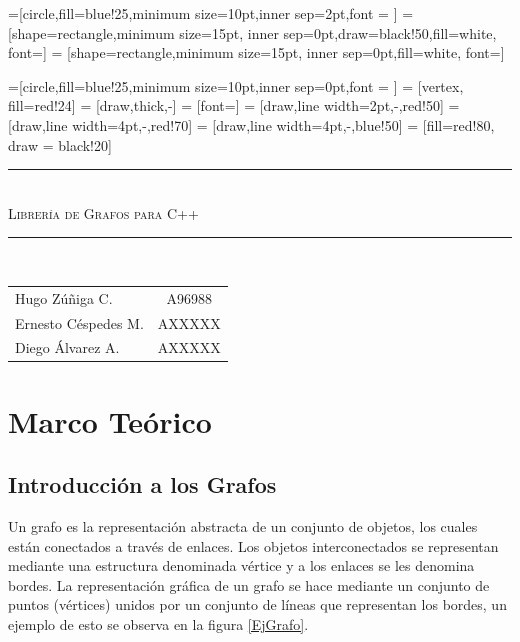 \documentclass[a4paper, 11pt]{report}
\newcommand{\HRule}[1]{\rule{\linewidth}{#1}}
\begin{document}
=[circle,fill=blue!25,minimum size=10pt,inner sep=2pt,font = \small]
 = [shape=rectangle,minimum size=15pt, inner sep=0pt,draw=black!50,fill=white, font=\scriptsize]
 = [shape=rectangle,minimum size=15pt, inner sep=0pt,fill=white, font=\footnotesize]

=[circle,fill=blue!25,minimum size=10pt,inner sep=0pt,font = \tiny]
 = [vertex, fill=red!24]
 = [draw,thick,-]
 = [font=\scriptsize]
 = [draw,line width=2pt,-,red!50]
 = [draw,line width=4pt,-,red!70]
 = [draw,line width=4pt,-,blue!50]
 = [fill=red!80, draw = black!20]

\begin{titlepage}
    \begin{center}
        \HRule{0.5mm}\\[0.12cm]
        \textsc{\huge Librer\'ia de Grafos para C++}\\[0.2cm]
        \HRule{0.8mm}\\[1.7cm]
        \begin{flushright}
        \begin{tabular}{l c}
            Hugo Z\'u\~niga C. & A96988 \\
            Ernesto C\'espedes M. & AXXXXX \\
            Diego \'Alvarez A. & AXXXXX \\
        \end{tabular}
        \end{flushright}

    \end{center}
\end{titlepage}

\chapter{Marco Te\'orico}
\section{Introducci\'on a los Grafos}
Un grafo es la representaci\'on abstracta de un conjunto de objetos, los cuales est\'an conectados a trav\'es de enlaces. Los objetos interconectados se representan mediante una estructura denominada v\'ertice y a los enlaces se les denomina bordes. La representaci\'on  gr\'afica de un grafo se hace mediante un conjunto de puntos (v\'ertices) unidos por un conjunto de l\'ineas que representan los bordes, un ejemplo de esto se observa en la figura \ref{EjGrafo}.
\end{document}
